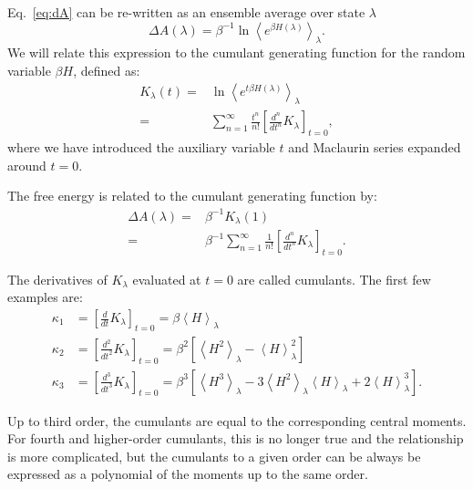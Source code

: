 \documentclass{article}
\begin{document}
Eq.~\ref{eq:dA} can be re-written as an ensemble average over state $\lambda$
\begin{equation}
\Delta A(\lambda) =
	\beta^{-1} \ln \left\langle e^{\beta H(\lambda)} \right\rangle_\lambda.
\label{eq:avg_expr}
\end{equation}
We will relate this expression to the cumulant generating function for the random variable $\beta H$, defined as:
\begin{align}
K_{\lambda}(t) =&
	\ln \left\langle 
    	e^{t \beta H(\lambda)}
    \right\rangle_\lambda \\
    =& 
    \sum_{n=1}^{\infty}
            	\frac{t^n}{n!}
                \left[ \frac{d^n}{dt^n} K_{\lambda}\right]_{t=0},
\end{align}
where we have introduced the auxiliary variable $t$ and Maclaurin series expanded around $t=0$.

The free energy is related to the cumulant generating function by:
\begin{align}
\Delta A(\lambda) =& \beta^{-1} K_{\lambda}(1) \nonumber\\
                  =& \beta^{-1} \sum_{n=1}^{\infty}
            			\frac{1}{n!}\left[
                        	\frac{d^n}{dt^n} K_{\lambda}
                        \right]_{t=0}.
\label{eq:cumu_dA}
\end{align}

The derivatives of $K_{\lambda}$ evaluated at $t=0$ are called cumulants. The first few examples are:
\begin{align}
\kappa_1 &=
	\left[\frac{d}{dt} K_{\lambda}\right]_{t=0} =
	\beta \left\langle H \right\rangle_\lambda \nonumber\\
\kappa_2 &=
	\left[\frac{d^2}{dt^2} K_{\lambda}\right]_{t=0} =
	\beta^2 \left[
		\left\langle H^2 \right\rangle_\lambda -
    	\left\langle H \right\rangle_\lambda^2
    \right] \nonumber\\
\kappa_3 &=
	\left[\frac{d^3}{dt^3} K_{\lambda} \right]_{t=0} =
	\beta^3 \left[
		\left\langle H^3 \right\rangle_\lambda -
    	3 \left\langle H^2 \right\rangle_\lambda
    		\left\langle H \right\rangle_\lambda +
    	2 \left\langle H \right\rangle_\lambda^3
    \right].
\label{eq:cumu}
\end{align}

Up to third order, the cumulants are equal to the corresponding central moments. For fourth and higher-order cumulants, this is no longer true and the relationship is more complicated, but the cumulants to a given order can be always be expressed as a polynomial of the moments up to the same order.
\end{document}
